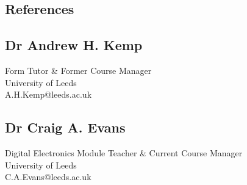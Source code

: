 \documentclass[margin]{res}
\begin{document}
\begin{resume}
\section{References}
\subsection{Dr Andrew H. Kemp}
Form Tutor \& Former Course Manager\\
University of Leeds\\
A.H.Kemp@leeds.ac.uk
\subsection{Dr Craig A. Evans}
Digital Electronics Module Teacher \& Current Course Manager\\
University of Leeds\\
C.A.Evans@leeds.ac.uk

\end{resume}
\end{document}
